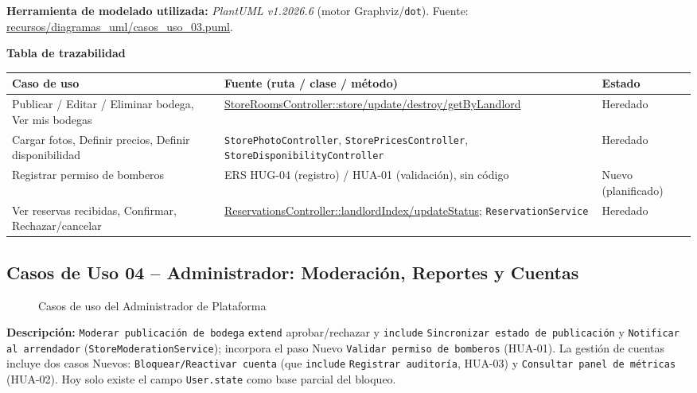 \bigskip
{\sloppy\noindent\textbf{Herramienta de modelado utilizada:} \textit{PlantUML v1.2026.6} (motor Graphviz/\texttt{dot}). Fuente: \url{recursos/diagramas_uml/casos_uso_03.puml}.\par}

\bigskip
\noindent\textbf{Tabla de trazabilidad}
\begin{longtable}{|L{5cm}|L{7.5cm}|M{2cm}|}
\hline
{} \textbf{Caso de uso} & \textbf{Fuente (ruta / clase / método)} & \textbf{Estado} \\ \hline
\endhead
Publicar / Editar / Eliminar bodega, Ver mis bodegas & \url{StoreRoomsController::store/update/destroy/getByLandlord} & Heredado \\ \hline
Cargar fotos, Definir precios, Definir disponibilidad & \texttt{StorePhotoController}, \texttt{StorePricesController}, \texttt{StoreDisponibilityController} & Heredado \\ \hline
Registrar permiso de bomberos & ERS HUG-04 (registro) / HUA-01 (validación), sin código & Nuevo (planificado) \\ \hline
Ver reservas recibidas, Confirmar, Rechazar/cancelar & \url{ReservationsController::landlordIndex/updateStatus}; \texttt{ReservationService} & Heredado \\ \hline
\end{longtable}
\clearpage

\subsection{Casos de Uso 04 -- Administrador: Moderación, Reportes y Cuentas}
\begin{figure}[H]
    \centering
    \caption{Casos de uso del Administrador de Plataforma}
    \label{fig:cu04}
\end{figure}
\noindent\textbf{Descripción:} \texttt{Moderar publicación de bodega} \texttt{\guillemotleft extend\guillemotright} aprobar/rechazar y \texttt{\guillemotleft include\guillemotright} \texttt{Sincronizar estado de publicación} y \texttt{Notificar al arrendador} (\texttt{StoreModerationService}); incorpora el paso Nuevo \texttt{Validar permiso de bomberos} (HUA-01). La gestión de cuentas incluye dos casos Nuevos: \texttt{Bloquear/Reactivar cuenta} (que \texttt{\guillemotleft include\guillemotright} \texttt{Registrar auditoría}, HUA-03) y \texttt{Consultar panel de métricas} (HUA-02). Hoy solo existe el campo \texttt{User.state} como base parcial del bloqueo.

